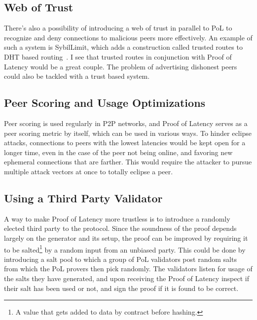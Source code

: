 \subsection{Web of Trust}
There's also a possibility of introducing a web of trust in parallel to PoL to recognize and deny connections to malicious peers more effectively. An example of such a system is SybilLimit, which adds a construction called trusted routes to DHT based routing~\cite{Yu2008-xl}. I see that trusted routes in conjunction with Proof of Latency would be a great couple. The problem of advertising dishonest peers could also be tackled with a trust based system.

\subsection{Peer Scoring and Usage Optimizations}
Peer scoring is used regularly in P2P networks, and Proof of Latency serves as a peer scoring metric by itself, which can be used in various ways. To hinder eclipse attacks, connections to peers with the lowest latencies would be kept open for a longer time, even in the case of the peer not being online, and favoring new ephemeral connections that are farther. This would require the attacker to pursue multiple attack vectors at once to totally eclipse a peer.


\subsection{Using a Third Party Validator}
A way to make Proof of Latency more trustless is to introduce a randomly elected third party to the protocol. Since the soundness of the proof depends largely on the generator and its setup, the proof can be improved by requiring it to be salted\footnote{A value that gets added to data by contract before hashing.} by a random input from an unbiased party. This could be done by introducing a salt pool to which a group of PoL validators post random salts from which the PoL provers then pick randomly. The validators listen for usage of the salts they have generated, and upon receiving the Proof of Latency inspect if their salt has been used or not, and sign the proof if it is found to be correct.



